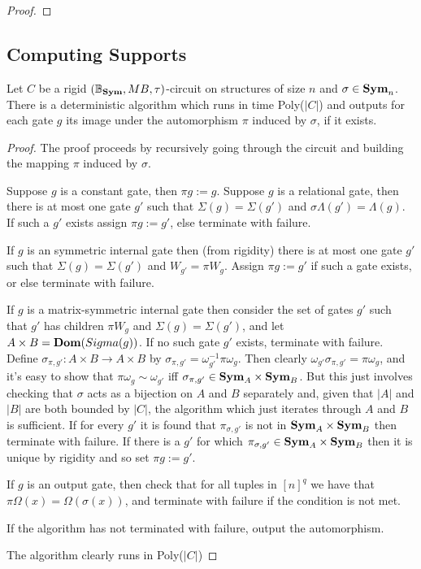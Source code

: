 \documentclass[../paper.tex]{subfiles}
\begin{document}
  \begin{proof}
  
  \end{proof}

  \subsection{Computing Supports}
  
 \begin{lem}
   Let $C$ be a rigid $(\mathbb{B}_{\text{\textbf{Sym}}}, MB, \tau)$-circuit on structures of size $n$ and
   $\sigma \in \text{\textbf{Sym}}_n$. There is a deterministic algorithm which runs in time
   Poly($\vert C \vert$) and outputs for each gate $g$ its image under the
   automorphism $\pi$ induced by $\sigma$, if it exists.
 \end{lem}
 \begin{proof}
   The proof proceeds by recursively going through the circuit and building the
   mapping $\pi$ induced by $\sigma$.

   Suppose $g$ is a constant gate, then $\pi g := g$. Suppose $g$ is a
   relational gate, then there is at most one gate $g'$ such that $\Sigma (g) =
   \Sigma (g')$ and $\sigma\Lambda (g') = \Lambda (g)$. If such a $g'$ exists
   assign $\pi g := g'$, else terminate with failure.

   If $g$ is an symmetric internal gate then (from rigidity) there is at most
   one gate $g'$ such that $\Sigma (g) = \Sigma(g')$ and $W_{g'} = \pi W_g$.
   Assign $\pi g := g'$ if such a gate exists, or else terminate with failure.

   If $g$ is a matrix-symmetric internal gate then consider the set of gates
   $g'$ such that $g'$ has children $\pi W_g$ and $\Sigma(g) = \Sigma(g')$, and
   let $A \times B = \text{\textbf{Dom}} (Sigma(g))$. If no such gate $g'$ exists, terminate
   with failure. Define $\sigma_{\pi, g'}:A \times B \rightarrow A \times B$ by
   $\sigma_{\pi, g'} = \omega^{-1}_{g'} \pi \omega_{g}$. Then clearly
   $\omega_{g'} \sigma_{\pi, g'} = \pi \omega_{g}$, and it's easy to show that
   $\pi \omega_g \sim \omega_{g'}$ iff $\sigma_{\pi,g'} \in \text{\textbf{Sym}}_A \times
   \text{\textbf{Sym}}_B$. But this just involves checking that $\sigma$ acts as a bijection on
   $A$ and $B$ separately and, given that $\vert A \vert$ and $\vert B \vert$
   are both bounded by $\vert C \vert$, the algorithm which just iterates
   through $A$ and $B$ is sufficient. If for every $g'$ it is found that
   $\pi_{\sigma,g'}$ is not in $\text{\textbf{Sym}}_A \times \text{\textbf{Sym}}_B$ then terminate with
   failure. If there is a $g'$ for which $\pi_{\sigma, g'} \in \text{\textbf{Sym}}_A \times
   \text{\textbf{Sym}}_B$ then it is unique by rigidity and so set $\pi g := g'$.

   If $g$ is an output gate, then check that for all tuples in $[n]^{q}$ we have
   that $\pi \Omega (x) = \Omega (\sigma (x))$, and terminate with failure if
   the condition is not met.

   If the algorithm has not terminated with failure, output the automorphism.

   The algorithm clearly runs in Poly($\vert C \vert$)
 \end{proof}
\end{document}
